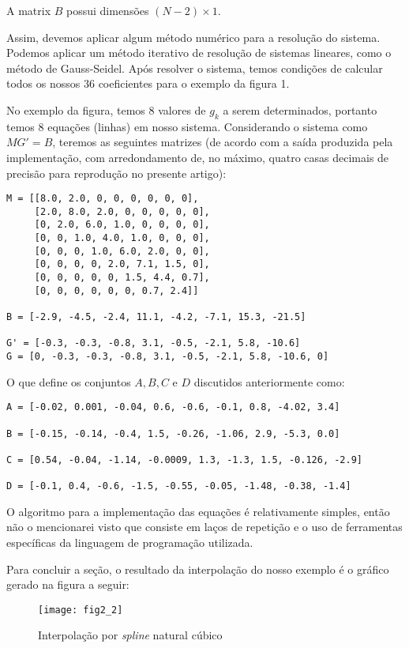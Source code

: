 \documentclass[11pt]{article}
\begin{document}
A matrix $B$ possui dimensões $(N-2) \times 1$.

Assim, devemos aplicar algum método numérico para a resolução do sistema.
Podemos aplicar um método iterativo de resolução de sistemas lineares, como
o método de Gauss-Seidel. Após resolver o sistema, temos condições de
calcular todos os nossos 36 coeficientes para o exemplo da figura 1.

No exemplo da figura, temos 8 valores de $g_k$ a serem determinados, portanto
temos 8 equações (linhas) em nosso sistema. Considerando o sistema
como $MG' = B$, teremos as seguintes matrizes (de acordo com a saída
produzida pela implementação, com arredondamento de, no máximo,
quatro casas decimais de precisão para reprodução no presente artigo):

\begin{verbatim}
M = [[8.0, 2.0, 0, 0, 0, 0, 0, 0],
     [2.0, 8.0, 2.0, 0, 0, 0, 0, 0],
     [0, 2.0, 6.0, 1.0, 0, 0, 0, 0],
     [0, 0, 1.0, 4.0, 1.0, 0, 0, 0],
     [0, 0, 0, 1.0, 6.0, 2.0, 0, 0],
     [0, 0, 0, 0, 2.0, 7.1, 1.5, 0],
     [0, 0, 0, 0, 0, 1.5, 4.4, 0.7],
     [0, 0, 0, 0, 0, 0, 0.7, 2.4]]

B = [-2.9, -4.5, -2.4, 11.1, -4.2, -7.1, 15.3, -21.5]

G' = [-0.3, -0.3, -0.8, 3.1, -0.5, -2.1, 5.8, -10.6]
G = [0, -0.3, -0.3, -0.8, 3.1, -0.5, -2.1, 5.8, -10.6, 0]

\end{verbatim}

O que define os conjuntos $A, B, C$ e $D$ discutidos anteriormente como:

\begin{verbatim}
A = [-0.02, 0.001, -0.04, 0.6, -0.6, -0.1, 0.8, -4.02, 3.4]

B = [-0.15, -0.14, -0.4, 1.5, -0.26, -1.06, 2.9, -5.3, 0.0]

C = [0.54, -0.04, -1.14, -0.0009, 1.3, -1.3, 1.5, -0.126, -2.9]

D = [-0.1, 0.4, -0.6, -1.5, -0.55, -0.05, -1.48, -0.38, -1.4]
\end{verbatim}

O algoritmo para a implementação das equações é relativamente simples,
então não o mencionarei visto que consiste em laços de repetição e o
uso de ferramentas específicas da linguagem de programação utilizada.

Para concluir a seção, o resultado da interpolação do nosso exemplo
é o gráfico gerado na figura a seguir: 

\begin{figure}[h]
\caption{Interpolação por \textit{spline} natural cúbico}
\texttt{[image: fig2\_2]}
\centering
\end{figure}
\end{document}
